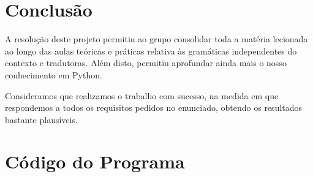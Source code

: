 \documentclass[11pt,a4paper]{report}
\begin{document}
\chapter{Conclusão} \label{concl}
A resolução deste projeto permitiu ao grupo consolidar toda a matéria lecionada ao longo das aulas teóricas e práticas relativa às gramáticas independentes do contexto e tradutoras. Além disto, permitiu aprofundar ainda mais o nosso conhecimento em Python.\par
Consideramos que realizamos o trabalho com sucesso, na medida em que respondemos a todos os requisitos pedidos no enunciado, obtendo os resultados bastante plausíveis.\par



\appendix %
\chapter{Código do Programa}
\end{document}
